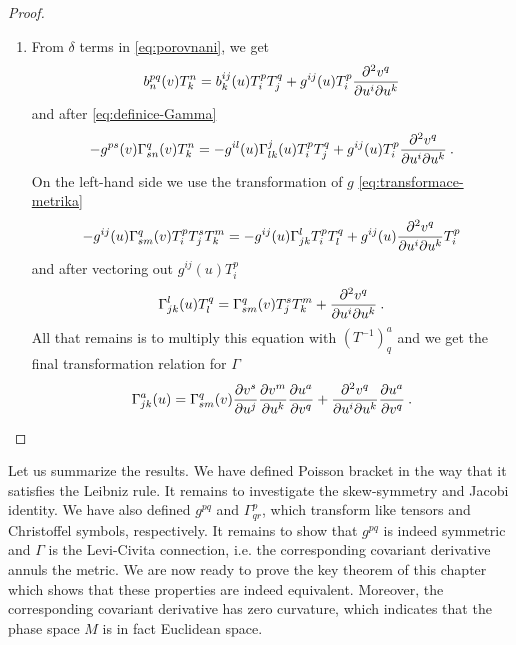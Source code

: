 \begin{proof}
\begin{enumerate}
        \item From $\delta$ terms in \eqref{eq:porovnani}, we get
        \begin{align}
            b^{pq}_n(v) T^n_k =
            b^{ij}_k(u) T^p_i T^q_j + g^{ij}(u) T^p_i \frac{\partial^2 v^q}{\partial u^i \partial u^k}
        \end{align}
        and after \eqref{eq:definice-Gamma}
        \begin{align}
            - g^{ps}(v) \Gamma^{q}_{sn}(v) T^n_k =
            - g^{il}(u) \Gamma^j_{lk}(u) T^p_i T^q_j + g^{ij}(u) T^p_i \frac{\partial^2 v^q}{\partial u^i \partial u^k} \:.
        \end{align}
        On the left-hand side we use the transformation of $g$ \eqref{eq:transformace-metrika}
        \begin{align}
            -g^{ij}(u) \Gamma^q_{sm}(v) T^p_i T^s_j T^m_k = - g^{ij}(u) \Gamma^l_{jk} T^p_i T^q_l + g^{ij}(u) \frac{\partial^2 v^q}{\partial u^i \partial u^k} T^p_i 
        \end{align}
        and after vectoring out $g^{ij}(u) T^p_i$
        \begin{align}
            \Gamma^l_{jk}(u) T^q_l = \Gamma^q_{sm}(v) T^s_j T^m_k + \frac{\partial^2 v^q}{\partial u^i \partial u^k} \:.
        \end{align}
        All that remains is to multiply this equation with $(T^{-1})^a_q$ and we get the final transformation relation for $\Gamma$
        \begin{align}
            \Gamma^a_{jk}(u) = \Gamma^q_{sm}(v) \frac{\partial v^s}{\partial u^j} \frac{\partial v^m}{\partial u^k} \frac{\partial u^a}{\partial v^q} + \frac{\partial^2 v^q}{\partial u^i \partial u^k} \frac{\partial u^a}{\partial v^q} \:.
        \end{align}
    \end{enumerate}
\end{proof}

Let us summarize the results. We have defined Poisson bracket in the way that it satisfies the Leibniz rule. It remains to investigate the skew-symmetry and Jacobi identity. We have also defined $g^{pq}$ and $\Gamma^p_{qr}$, which transform like tensors and Christoffel symbols, respectively. It remains to show that $g^{pq}$ is indeed symmetric and $\Gamma$ is the Levi-Civita connection, i.e. the corresponding covariant derivative annuls the metric. We are now ready to prove the key theorem of this chapter which shows that these properties are indeed equivalent. Moreover, the corresponding covariant derivative has zero curvature, which indicates that the phase space $M$ is in fact Euclidean space.

